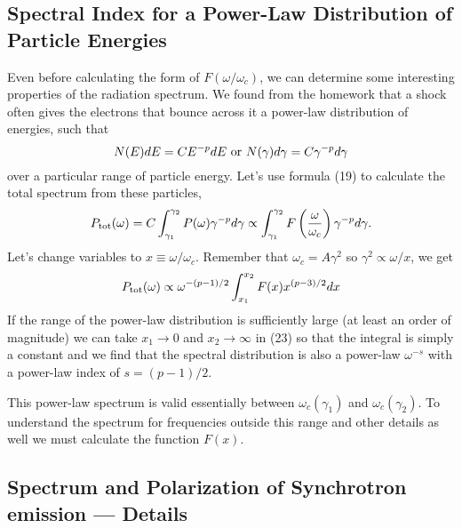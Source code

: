 \subsection[Power-Law Distribution of Particle Energies]{Spectral Index for a Power-Law Distribution of Particle
\label{sec:spectral-index-power}
  Energies}

Even before calculating the form of $F(\omega/\omega_c)$, we can
determine some interesting properties of the radiation spectrum.
We found from the homework that a shock often gives the electrons that
bounce across it a power-law distribution of energies, such that
\begin{equation}
N(E) dE = C E^{-p} dE~\hbox{\rm or}~N(\gamma) d\gamma = C \gamma^{-p} d\gamma
\label{eq:380}
\end{equation}
over a particular range of particle energy.  Let's use formula (19) to
calculate the total spectrum from these particles,
\begin{equation}
P_{\hbox{\rm \scriptsize tot}} (\omega) = C \int_{\gamma_1}^{\gamma_2} P(\omega) \gamma^{-p}
d\gamma 
\propto \int_{\gamma_1}^{\gamma_2}
F\left(\frac{\omega}{\omega_c}\right) 
\gamma^{-p}d\gamma.
\label{eq:381}
\end{equation}
Let's change variables to $x\equiv \omega/\omega_c$.  Remember that
$\omega_c = A \gamma^2$ so $\gamma^2 \propto \omega/x$, we get
\begin{equation}
P_{\hbox{\rm \scriptsize tot}}(\omega) \propto \omega^{-(p-1)/2} \int_{x_1}^{x_2} F(x)
x^{(p-3)/2} d x
\label{eq:382}
\end{equation}
If the range of the power-law distribution is sufficiently large (at
least an order of magnitude) we can take $x_1\rightarrow 0$ and $x_2
\rightarrow \infty$ in (23) so that the integral is simply a constant
and we find that the spectral distribution is also a power-law
$\omega^{-s}$ with a power-law index of $s=(p-1)/2$.  

This power-law spectrum is valid essentially between
$\omega_c(\gamma_1)$ and $\omega_c(\gamma_2)$.  To understand the
spectrum for frequencies outside this range and other details as well
we must calculate the function $F(x)$.

\subsection[Spectrum --- Details]{Spectrum and Polarization of Synchrotron emission ---
\label{sec:spectr-polar-synchr}
  Details}

